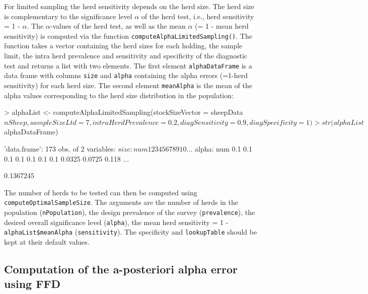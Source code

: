 \documentclass[nojss]{jss}
\begin{document}
For limited sampling the herd sensitivity depends on the herd size. The herd size is complementary to the significance level $\alpha$ of the herd test, i.e., herd sensitivity = 1 - $\alpha$. The $\alpha$-values of the herd test, as well as the mean $\alpha$ (= 1 - mean herd sensitivity) is computed via the function \texttt{computeAlphaLimitedSampling()}.  The function takes a vector containing the herd sizes for each holding, the sample limit, the intra herd prevalence and sensitivity and specificity of the diagnostic test and returns a list with two elements. The first element \texttt{alphaDataFrame} is a data frame with columns \texttt{size} and \texttt{alpha} containing the alpha errors (=1-herd sensitivity) for each herd size. The second element \texttt{meanAlpha} is the mean of the alpha values corresponding to the herd size distribution in the population:

\begin{Schunk}
\begin{Sinput}
> alphaList <- computeAlphaLimitedSampling(stockSizeVector = sheepData$nSheep,
       sampleSizeLtd = 7, intraHerdPrevalence = 0.2, diagSensitivity = 0.9,
       diagSpecificity = 1)
> str(alphaList$alphaDataFrame)
\end{Sinput}
\begin{Soutput}
'data.frame':	173 obs. of  2 variables:
 $ size : num  1 2 3 4 5 6 7 8 9 10 ...
 $ alpha: num  0.1 0.1 0.1 0.1 0.1 0.1 0.1 0.0325 0.0725 0.118 ...
\end{Soutput}
\begin{Soutput}
[1] 0.1367245
\end{Soutput}
\end{Schunk}

The number of herds to be tested can then be computed using \texttt{computeOptimalSampleSize}. The arguments are the number of herds in the population (\texttt{nPopulation}), the design prevalence of the survey (\texttt{prevalence}), the desired overall significance level (\texttt{alpha}), the mean herd sensitivity = 1 - \texttt{alphaList\$meanAlpha} (\texttt{sensitivity}). The specificity and \texttt{lookupTable} should be kept at their default values.


\subsection{Computation of the a-posteriori alpha error using FFD}
\end{document}

